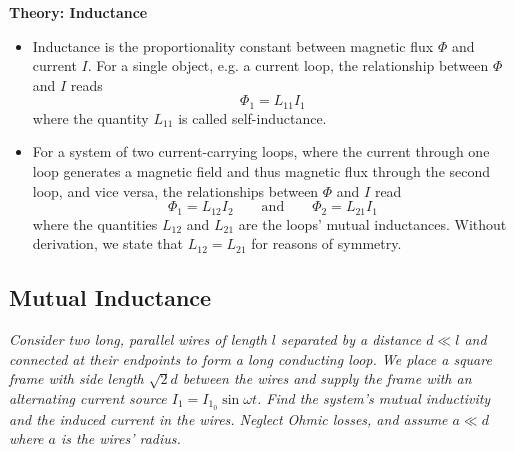 \documentclass[11pt, a4paper]{article}
\newcommand{\eqtext}[1]{\qquad \text{#1} \qquad}
\begin{document}
\textbf{Theory: Inductance}
\begin{itemize}
	\item Inductance is the proportionality constant between magnetic flux $ \Phi $ and current $ I $. For a single object, e.g. a current loop, the relationship between $ \Phi $ and $ I $ reads
	\begin{equation*}
		\Phi_{1} = L_{11} I_{1}
	\end{equation*}
	where the quantity $ L_{11} $ is called self-inductance. 
	
	\item For a system of two current-carrying loops, where the current through one loop generates a magnetic field and thus magnetic flux through the second loop, and vice versa, the relationships between $ \Phi $ and $ I $ read
	\begin{equation*}
		\Phi_{1} = L_{12}I_{2} \eqtext{and}  \Phi_{2} = L_{21}I_{1}
	\end{equation*}
	where the quantities $ L_{12} $ and $ L_{21} $ are the loops' mutual inductances. Without derivation, we state that $ L_{12} = L_{21} $ for reasons of symmetry.
	
\end{itemize}





\subsection{Mutual Inductance}


\textit{Consider two long, parallel wires of length $ l $ separated by a distance $ d \ll l $ and connected at their endpoints to form a long conducting loop. We place a square frame with side length $ \sqrt{2}d $ between the wires and supply the frame with an alternating current source $ I_{1} = I_{1_{0}}\sin \omega t $. Find the system's mutual inductivity and the induced current in the wires. Neglect Ohmic losses, and assume $ a \ll d $ where $ a $ is the wires' radius.}
\end{document}
